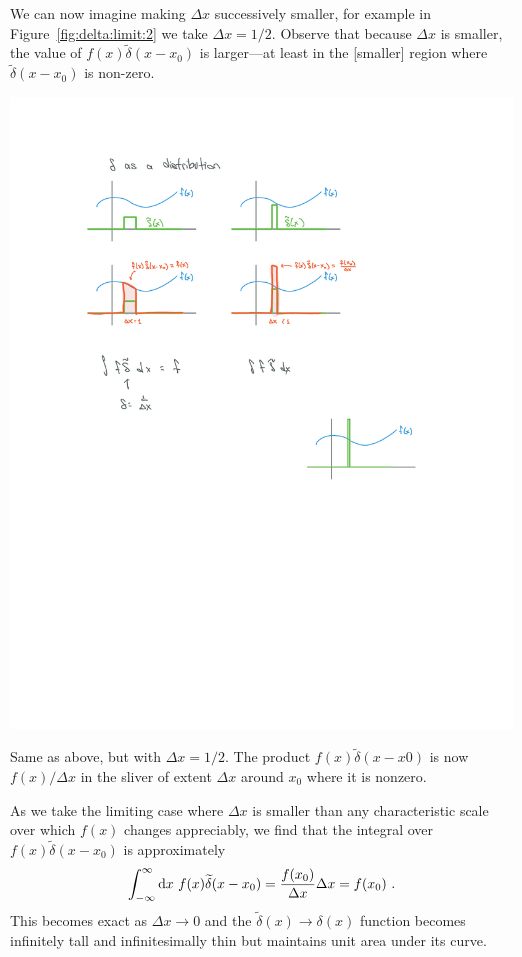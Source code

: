 \begin{subappendices}
We can now imagine making $\Delta x$ successively smaller, for example in Figure~\ref{fig:delta:limit:2} we take $\Delta x = 1/2$. Observe that because $\Delta x$ is smaller, the value of $f(x)\tilde\delta(x-x_0)$ is larger---at least in the [smaller] region where $\tilde\delta(x-x_0)$ is non-zero. 
\begin{marginfigure}%
    \includegraphics[width=\textwidth]{figures/Delta_limit_02.pdf}
    \caption{Same as above, but with $\Delta x = 1/2$. The product $f(x)\tilde \delta(x-x0)$ is now $f(x)/\Delta x$ in the sliver of extent $\Delta x$ around $x_0$ where it is nonzero.}
    \label{fig:delta:limit:2}
\end{marginfigure}
As we take the limiting case where $\Delta x$ is smaller than any characteristic scale over which $f(x)$ changes appreciably, we find that the integral over $f(x)\tilde\delta(x-x_0)$ is approximately
\begin{align}
    \int_{-\infty}^\infty \operatorname{d}\mkern-3mu^{}\mkern-1mu{x}\,\, f(x)\widetilde\delta(x-x_0) = \frac{f(x_0)}{\Delta x} \Delta x = f(x_0) \ .
\end{align}
This becomes exact as $\Delta x \to 0$ and the $\tilde\delta(x)\to \delta(x)$ function becomes infinitely tall and infinitesimally thin but maintains unit area under its curve.


\end{subappendices}
